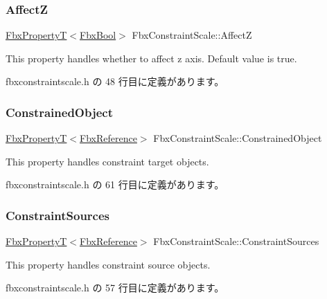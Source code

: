 \subsubsection{\texorpdfstring{AffectZ}{AffectZ}}
{\footnotesize\ttfamily \hyperlink{class_fbx_property_t}{Fbx\+PropertyT}$<$\hyperlink{fbxtypes_8h_a92e0562b2fe33e76a242f498b362262e}{Fbx\+Bool}$>$ Fbx\+Constraint\+Scale\+::\+AffectZ}

This property handles whether to affect z axis. Default value is true. 

 fbxconstraintscale.\+h の 48 行目に定義があります。

\mbox{\label{class_fbx_constraint_scale_ae5eb43970ba98186d43fdb51498b21c5}} 
\subsubsection{\texorpdfstring{Constrained\+Object}{ConstrainedObject}}
{\footnotesize\ttfamily \hyperlink{class_fbx_property_t}{Fbx\+PropertyT}$<$\hyperlink{fbxtypes_8h_a44df6a2eec915cf27cd481e5c5e48a24}{Fbx\+Reference}$>$ Fbx\+Constraint\+Scale\+::\+Constrained\+Object}

This property handles constraint target objects. 

 fbxconstraintscale.\+h の 61 行目に定義があります。

\mbox{\label{class_fbx_constraint_scale_a434954eedd1e80d6935881b37e9da11f}} 
\subsubsection{\texorpdfstring{Constraint\+Sources}{ConstraintSources}}
{\footnotesize\ttfamily \hyperlink{class_fbx_property_t}{Fbx\+PropertyT}$<$\hyperlink{fbxtypes_8h_a44df6a2eec915cf27cd481e5c5e48a24}{Fbx\+Reference}$>$ Fbx\+Constraint\+Scale\+::\+Constraint\+Sources}

This property handles constraint source objects. 

 fbxconstraintscale.\+h の 57 行目に定義があります。

